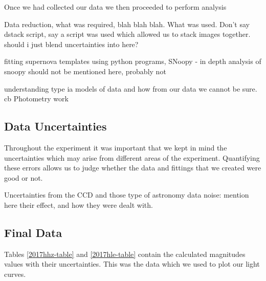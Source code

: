 \documentclass[twocolumn]{revtex4}
\begin{document}
Once we had collected our data we then proceeded to perform analysis

Data reduction, what was required, blah blah blah. What was used. Don't say dstack script, say a script was used which allowed us to stack images together. should i just blend uncertainties into here? 

fitting supernova templates using python programs, SNoopy - in depth analysis of snoopy should not be mentioned here, probably not

understanding type ia models of data and how from our data we cannot be sure.  
 cb
Photometry work 

\vspace{-3ex}
\subsection{Data Uncertainties}
\vspace{-2ex}

Throughout the experiment it was important that we kept in mind the uncertainties which may arise from different areas of the experiment. Quantifying these errors allows us to judge whether the data and fittings that we created were good or not. 

Uncertainties from the CCD and those type of astronomy data noise: mention here their effect, and how they were dealt with. 

\vspace{-3ex}
\subsection{Final Data}
\vspace{-2ex}
Tables \ref{2017hhz-table} and \ref{2017hle-table} contain the calculated magnitudes values with their uncertainties. This was the data which we used to plot our light curves.
\end{document}

